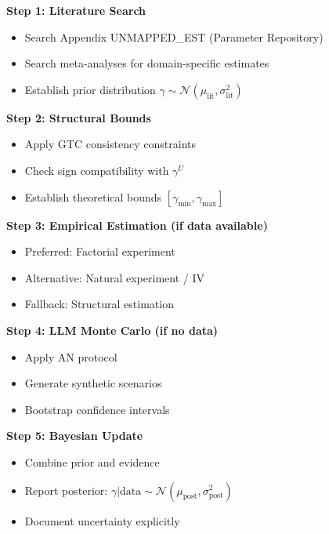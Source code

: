 \begin{tcolorbox}[colback=green!5!white,colframe=green!75!black,title=\textbf{Standard Protocol for γ Estimation}]
\textbf{Step 1: Literature Search}
\begin{itemize}[noitemsep]
    \item Search Appendix UNMAPPED_EST (Parameter Repository)
    \item Search meta-analyses for domain-specific estimates
    \item Establish prior distribution $\gamma \sim \mathcal{N}(\mu_{\text{lit}}, \sigma_{\text{lit}}^2)$
\end{itemize}

\textbf{Step 2: Structural Bounds}
\begin{itemize}[noitemsep]
    \item Apply GTC consistency constraints
    \item Check sign compatibility with $\gamma^U$
    \item Establish theoretical bounds $[\gamma_{\min}, \gamma_{\max}]$
\end{itemize}

\textbf{Step 3: Empirical Estimation (if data available)}
\begin{itemize}[noitemsep]
    \item Preferred: Factorial experiment
    \item Alternative: Natural experiment / IV
    \item Fallback: Structural estimation
\end{itemize}

\textbf{Step 4: LLM Monte Carlo (if no data)}
\begin{itemize}[noitemsep]
    \item Apply AN protocol
    \item Generate synthetic scenarios
    \item Bootstrap confidence intervals
\end{itemize}

\textbf{Step 5: Bayesian Update}
\begin{itemize}[noitemsep]
    \item Combine prior and evidence
    \item Report posterior: $\gamma | \text{data} \sim \mathcal{N}(\mu_{\text{post}}, \sigma_{\text{post}}^2)$
    \item Document uncertainty explicitly
\end{itemize}
\end{tcolorbox}

